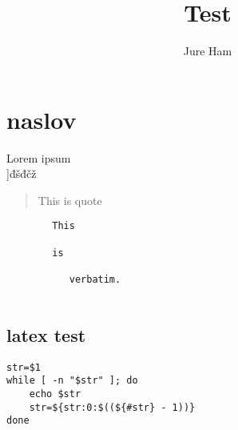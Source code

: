 \documentclass[12pt]{article}
\begin{document}
\title{Test}
\author{Jure Ham}
\maketitle
\section{naslov}
		Lorem ipsum 
\\
]đšđčž
		
\begin{quote}
			This is quote
		
\end{quote}
\begin{verbatim}
		This
		
		is
		
		   verbatim.
		
\end{verbatim}
		\subsection{latex test}
		
\pagebreak
\begin{lstlisting}[label=example,caption=Example,tabsize=2]
str=$1
while [ -n "$str" ]; do
	echo $str
	str=${str:0:$((${#str} - 1))}
done
		
\end{lstlisting}
\end{document}
